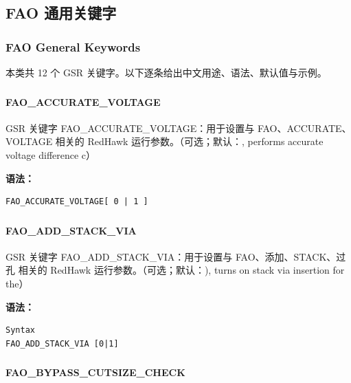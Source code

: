 \subsection{FAO 通用关键字}
\subsubsection*{FAO General Keywords}

本类共 12 个 GSR 关键字。以下逐条给出中文用途、语法、默认值与示例。

\subsubsection{}
\paragraph*{FAO_ACCURATE_VOLTAGE}

GSR 关键字 FAO_ACCURATE_VOLTAGE：用于设置与 FAO、ACCURATE、VOLTAGE 相关的 RedHawk 运行参数。（可选；默认：, performs accurate voltage difference c）

\textbf{语法：}
\begin{lstlisting}
FAO_ACCURATE_VOLTAGE[ 0 | 1 ]
\end{lstlisting}

\subsubsection{}
\paragraph*{FAO_ADD_STACK_VIA}

GSR 关键字 FAO_ADD_STACK_VIA：用于设置与 FAO、添加、STACK、过孔 相关的 RedHawk 运行参数。（可选；默认：), turns on stack via insertion for the）

\textbf{语法：}
\begin{lstlisting}
Syntax
FAO_ADD_STACK_VIA [0|1]
\end{lstlisting}

\subsubsection{}
\paragraph*{FAO_BYPASS_CUTSIZE_CHECK}

